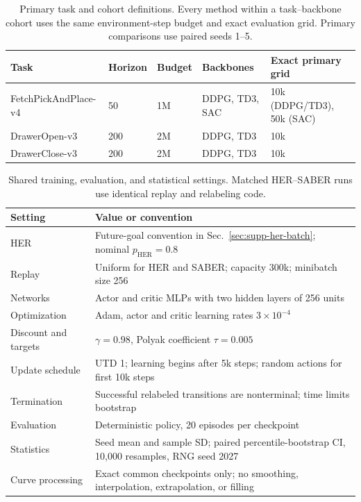 \begin{table}[t]
\centering
\small
\setlength{\tabcolsep}{6pt}
\begin{tabular}{lllll}
\toprule
Task & Horizon & Budget & Backbones & Exact primary grid \\
\midrule
FetchPickAndPlace-v4 & 50 & 1M & DDPG, TD3, SAC & 10k (DDPG/TD3), 50k (SAC) \\
DrawerOpen-v3 & 200 & 2M & DDPG, TD3 & 10k \\
DrawerClose-v3 & 200 & 2M & DDPG, TD3 & 10k \\
\bottomrule
\end{tabular}
\caption{Primary task and cohort definitions. Every method within a
task--backbone cohort uses the same environment-step budget and exact
evaluation grid. Primary comparisons use paired seeds 1--5.}
\label{tab:supp-task-cohorts}
\end{table}

\begin{table}[t]
\centering
\small
\setlength{\tabcolsep}{5pt}
\begin{tabular}{ll}
\toprule
Setting & Value or convention \\
\midrule
HER & Future-goal convention in Sec.~\ref{sec:supp-her-batch}; nominal \(p_{\mathrm{HER}}=0.8\) \\
Replay & Uniform for HER and SABER; capacity 300k; minibatch size 256 \\
Networks & Actor and critic MLPs with two hidden layers of 256 units \\
Optimization & Adam, actor and critic learning rates \(3\times10^{-4}\) \\
Discount and targets & \(\gamma=0.98\), Polyak coefficient \(\tau=0.005\) \\
Update schedule & UTD 1; learning begins after 5k steps; random actions for first 10k steps \\
Termination & Successful relabeled transitions are nonterminal; time limits bootstrap \\
Evaluation & Deterministic policy, 20 episodes per checkpoint \\
Statistics & Seed mean and sample SD; paired percentile-bootstrap CI, 10,000 resamples, RNG seed 2027 \\
Curve processing & Exact common checkpoints only; no smoothing, interpolation, extrapolation, or filling \\
\bottomrule
\end{tabular}
\caption{Shared training, evaluation, and statistical settings. Matched
HER--SABER runs use identical replay and relabeling code.}
\label{tab:supp-shared-settings}
\end{table}

